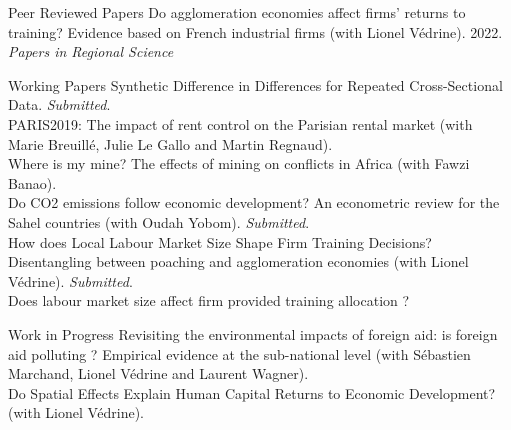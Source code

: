 \documentclass{resume} %
\begin{document}
\newpage
\begin{rSection}{Peer Reviewed Papers}
\vspace*{4mm}
Do agglomeration economies affect firms’ returns to training? Evidence based on French industrial firms (with Lionel Védrine). 2022. \textit{Papers in Regional Science}
\end{rSection}
\begin{rSection}{Working Papers}
\vspace*{4mm}
Synthetic Difference in Differences for Repeated Cross-Sectional Data. \textit{Submitted}.\\

PARIS2019: The impact of rent control on the Parisian rental market (with Marie Breuillé, Julie Le Gallo and Martin Regnaud).\\

Where is my mine? The effects of mining on conflicts in Africa (with Fawzi Banao).\\

Do CO2 emissions follow economic development? An econometric review for the Sahel countries (with Oudah Yobom). \textit{Submitted}.\\


How does Local Labour Market Size Shape Firm Training Decisions? Disentangling between poaching and agglomeration economies (with Lionel Védrine). \textit{Submitted}.\\

Does labour market size affect firm provided training allocation ? 
\end{rSection}

\begin{rSection}{Work in Progress}
\vspace*{4mm}
Revisiting the environmental impacts of foreign aid: is foreign aid polluting ? Empirical evidence at the sub-national level (with Sébastien Marchand, Lionel Védrine and Laurent Wagner).\\

Do Spatial Effects Explain Human Capital Returns to Economic Development? (with Lionel Védrine).
\end{rSection}
\end{document}
